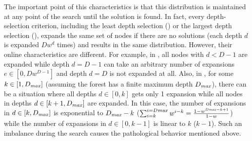 The important point of this characteristics is that this distribution is maintained at any point of the search
until the solution is found. In fact, every depth-selection criterion, including the least depth selection (\fifo) or
the largest depth selection (\lifo), expands the same set of nodes if there are no solutions (each depth
$d$ is expanded $Dw^d$ times) and results in the same distribution.
However, their online characteristics are different.
For example, in \fifo, all nodes with $d<D-1$ are expanded while depth $d=D-1$ can take an arbitrary number of expansions $e \in [0, Dw^{D-1}]$ and depth $d=D$ is not expanded at all.
Also, in \lifo, for some $k\in [1,D_\mit{max}]$ (assuming the forest has a finite maximum depth $D_\mit{max}$), there can be a situation where all depths $d \in [0,k]$ gets only 1 expansion
while all nodes in depths $d \in [k+1,D_\mit{max}]$ are expanded. In this case, the number of expansions in $d \in [k,D_\mit{max}]$ is exponential to $D_\mit{max}-k$ ($\sum_{i=k}^{i=D\mit{max}}w^{i-k}=\frac{1-w^{D\mit{max}-k+1}}{1-w}$) while the number of expansions in $d \in [0,k-1]$ is linear to $k$ ($k-1$). Such an imbalance during the search causes the pathological behavior mentioned above.


